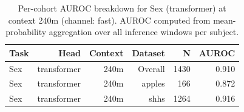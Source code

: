 \begin{table}[ht]
\centering
\caption{Per-cohort AUROC breakdown for Sex (transformer) at context 240m (channel: fast). AUROC computed from mean-probability aggregation over all inference windows per subject.}
\label{tab:cohort_sex_binary_transformer_fast}
\begin{tabular}{lrrrrr}
\toprule
Task & Head & Context & Dataset & N & AUROC \\
\midrule
Sex & transformer & 240m & Overall & 1430 & 0.910 \\
Sex & transformer & 240m & apples & 166 & 0.872 \\
Sex & transformer & 240m & shhs & 1264 & 0.916 \\
\bottomrule
\end{tabular}
\end{table}